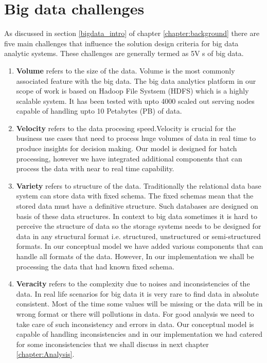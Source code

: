 \section{Big data challenges}
As discussed in section \ref{bigdata_intro} of chapter \ref{chapter:background} there are five main challenges that influence the solution design criteria for big data analytic systems. These challenges are generally termed as 5V s of big data.
\begin{enumerate}
\item \textbf{Volume} refers to the size of the data. Volume is the most commonly associated feature with the big data. The big data analytics platform in our scope of work is based on Hadoop File Systsem (HDFS) which is a highly scalable system. It has been tested with upto 4000 scaled out serving nodes capable of handling upto 10 Petabytes (PB) of data.
\item \textbf{Velocity} refers to the data procesing speed.Velocity is crucial for the business use cases that need to process huge volumes of data in real time to produce insights for decision making. Our model is designed for batch processing, however we have integrated additional components that can process the data with near to real time capability.
\item \textbf{Variety} refers to structure of the data. Traditionally the relational data base system can store data with fixed schema. The fixed schemas mean that the stored data must have a definitive structure. Such databases are designed on basis of these data structures. In context to big data sometimes it is hard to perceive the structure of data so the storage systems needs to be designed for data in any structural format i.e. structured, unstructured or semi-structured formats. In our conceptual model we have added various components that can handle all formats of the data. However, In our implementation we shall be processing the data that had known fixed schema. 
\item \textbf{Veracity} refers to the complexity due to noises and inconsistencies of the data. In real life scenarios for big data it is very rare to find data in absolute consistent. Most of the time some values will be missing or the data will be in wrong format or there will pollutions in data. For good analysis we need to take care of such inconsistency and errors in data. Our conceptual model is capable of handling inconsistencies and in our implementation we had catered for some inconsistencies that we shall discuss in next chapter \ref{chapter:Analysis}. 

\end{enumerate}
